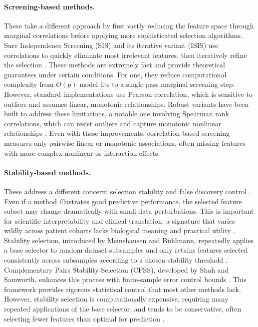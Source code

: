 \documentclass[11pt]{article}
\begin{document}
\paragraph{Screening-based methods.} These take a different approach by first vastly reducing the
feature space through marginal correlations before applying more sophisticated selection algorithms.
Sure Independence Screening (SIS) and its iterative variant (ISIS) use correlations to quickly
eliminate most irrelevant features, then iteratively refine the selection
\citep{fan2008,fan2009,fan2010}. These methods are extremely fast and provide theoretical guarantees
under certain conditions. For one, they reduce computational complexity from $O(p)$ model fits to a
single-pass marginal screening step. However, standard implementations use Pearson correlation, which
is sensitive to outliers and assumes linear, monotonic relationships. Robust variants have been built
to address these limitations, a notable one involving Spearman rank correlations, which can resist
outliers and capture monotonic nonlinear relationships \citep{li2012,wang2013,croux2010}. Even with
these improvements, correlation-based screening measures only pairwise linear or monotonic
associations, often missing features with more complex nonlinear or interaction effects.

\paragraph{Stability-based methods.} These address a different concern: selection stability and false
discovery control \citep{meinshausen2010,nogueira2018}. Even if a method illustrates good predictive
performance, the selected feature subset may change dramatically with small data perturbations. This
is important for scientific interpretability and clinical translation: a signature that varies wildly
across patient cohorts lacks biological meaning and practical utility
\citep{nogueira2018,eindor2005,michiels2005}. Stability selection, introduced by Meinshausen and
B\"uhlmann, repeatedly applies a base selector to random dataset subsamples and only retains features
selected consistently across subsamples according to a chosen stability threshold
\citep{meinshausen2010}. Complementary Pairs Stability Selection (CPSS), developed by Shah and
Samworth, enhances this process with finite-sample error control bounds \citep{shah2013}. This
framework provides rigorous statistical control that most other methods lack. However, stability
selection is computationally expensive, requiring many repeated applications of the base selector,
and tends to be conservative, often selecting fewer features than optimal for prediction
\citep{hofner2015}.
\end{document}
